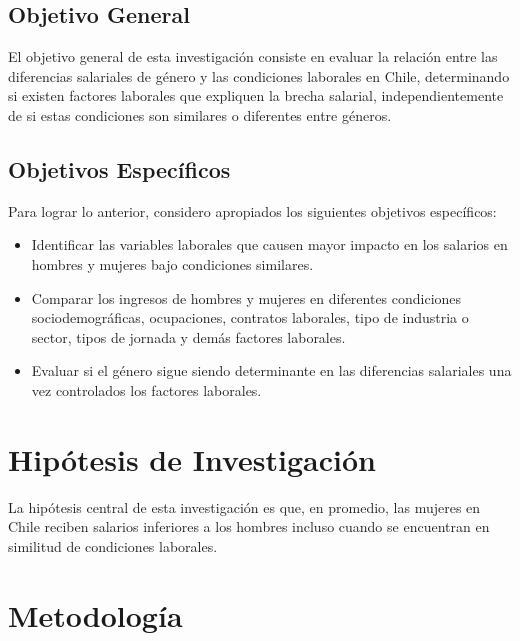 \subsection{Objetivo General}


El objetivo general de esta investigación consiste en evaluar la relación entre las diferencias salariales de género y las condiciones laborales en Chile, determinando si existen factores laborales que expliquen la brecha salarial, independientemente de si estas condiciones son similares o diferentes entre géneros.

\subsection{Objetivos Específicos}


Para lograr lo anterior, considero apropiados los siguientes objetivos específicos:

\begin{itemize}
    \item Identificar las variables laborales que causen mayor impacto en los salarios en hombres y mujeres bajo condiciones similares.
    \item Comparar los ingresos de hombres y mujeres en diferentes condiciones sociodemográficas, ocupaciones,  contratos laborales, tipo de industria o sector, tipos de jornada y demás factores laborales.
    \item Evaluar si el género sigue siendo determinante en las diferencias salariales una vez controlados los factores laborales.
\end{itemize}

\section{Hipótesis de Investigación}

La hipótesis central de esta investigación es que, en promedio, las mujeres en Chile reciben salarios inferiores a los hombres incluso cuando se encuentran en similitud de condiciones laborales.

\section{Metodología} 

